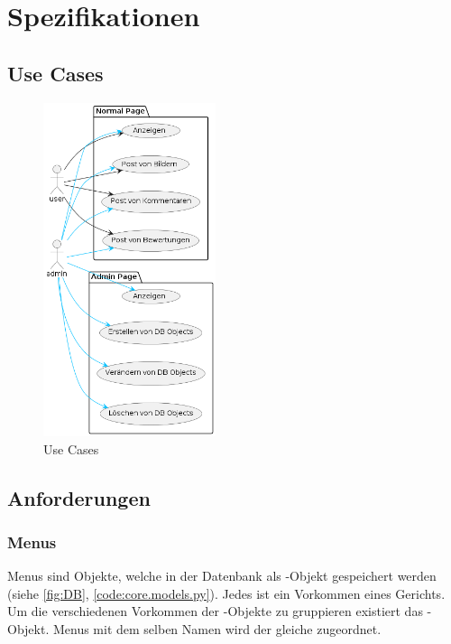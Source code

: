 \chapter{Spezifikationen}

\section{Use Cases} \label{sec:UseCases}
\begin{figure}[ht!]
    \centering
    \includegraphics[width=0.45\textwidth]{images/Use Case.png}
    \caption{Use Cases}
    \label{fig:UseCases}
\end{figure}

\newpage

\section{Anforderungen} \label{sec:Anforderungen}
\subsection{Menus} \label{spez:Menus}

Menus sind Objekte, welche in der Datenbank als -Objekt gespeichert
werden (siehe \ref{fig:DB}, \ref{code:core.models.py}). Jedes  ist
ein Vorkommen eines Gerichts. Um die verschiedenen Vorkommen der
-Objekte zu gruppieren existiert das -Objekt.
Menus mit dem selben Namen wird der gleiche  zugeordnet.

